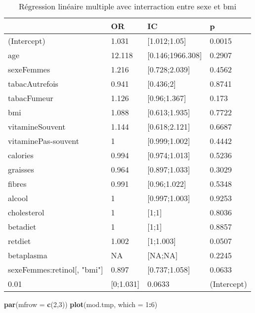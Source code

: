 \documentclass[]{article}
\newenvironment{Shaded}{\begin{snugshade}}{\end{snugshade}}
\newcommand{\KeywordTok}[1]{\textcolor[rgb]{0.13,0.29,0.53}{\textbf{#1}}}
\newcommand{\DataTypeTok}[1]{\textcolor[rgb]{0.13,0.29,0.53}{#1}}
\newcommand{\DecValTok}[1]{\textcolor[rgb]{0.00,0.00,0.81}{#1}}
\newcommand{\OperatorTok}[1]{\textcolor[rgb]{0.81,0.36,0.00}{\textbf{#1}}}
\newcommand{\NormalTok}[1]{#1}
\begin{document}
\begin{table}

\caption{\label{tab:unnamed-chunk-84}Régression linéaire multiple avec interraction entre sexe et bmi}
\centering
\begin{tabular}[t]{l|l|l|l}
\hline
  & OR & IC & p\\
\hline
\rowcolor[HTML]{BBD2E1}  (Intercept) & 1.031 & [1.012;1.05] & 0.0015\\
\hline
age & 12.118 & [0.146;1966.308] & 0.2907\\
\hline
\rowcolor[HTML]{BBD2E1}  sexeFemmes & 1.216 & [0.728;2.039] & 0.4562\\
\hline
tabacAutrefois & 0.941 & [0.436;2] & 0.8741\\
\hline
\rowcolor[HTML]{BBD2E1}  tabacFumeur & 1.126 & [0.96;1.367] & 0.173\\
\hline
bmi & 1.088 & [0.613;1.935] & 0.7722\\
\hline
\rowcolor[HTML]{BBD2E1}  vitamineSouvent & 1.144 & [0.618;2.121] & 0.6687\\
\hline
vitaminePas-souvent & 1 & [0.999;1.002] & 0.4442\\
\hline
\rowcolor[HTML]{BBD2E1}  calories & 0.994 & [0.974;1.013] & 0.5236\\
\hline
graisses & 0.964 & [0.897;1.033] & 0.3029\\
\hline
\rowcolor[HTML]{BBD2E1}  fibres & 0.991 & [0.96;1.022] & 0.5348\\
\hline
alcool & 1 & [0.997;1.003] & 0.9253\\
\hline
\rowcolor[HTML]{BBD2E1}  cholesterol & 1 & [1;1] & 0.8036\\
\hline
betadiet & 1 & [1;1] & 0.8857\\
\hline
\rowcolor[HTML]{BBD2E1}  retdiet & 1.002 & [1;1.003] & 0.0507\\
\hline
betaplasma & NA & [NA;NA] & 0.2245\\
\hline
\rowcolor[HTML]{BBD2E1}  sexeFemmes:retinol[, "bmi"] & 0.897 & [0.737;1.058] & 0.0633\\
\hline
0.01 & [0;1.031] & 0.0633 & (Intercept)\\
\hline
\end{tabular}
\end{table}

\begin{Shaded}
\begin{Highlighting}[]
\KeywordTok{par}\NormalTok{(}\DataTypeTok{mfrow =} \KeywordTok{c}\NormalTok{(}\DecValTok{2}\NormalTok{,}\DecValTok{3}\NormalTok{))}
\KeywordTok{plot}\NormalTok{(mod.tmp, }\DataTypeTok{which =} \DecValTok{1}\OperatorTok{:}\DecValTok{6}\NormalTok{)}
\end{Highlighting}
\end{Shaded}
\end{document}
